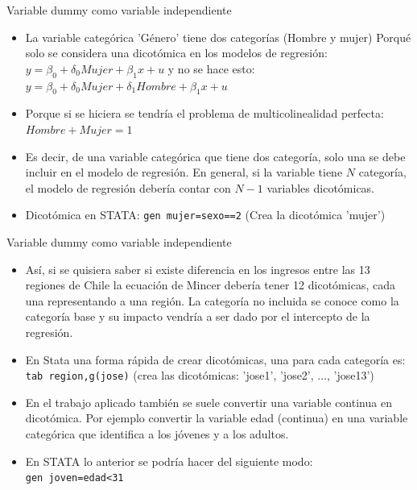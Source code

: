 \begin{frame}{Variable dummy como variable independiente}
	\begin{itemize}
		\item La variable categórica 'Género' tiene dos categorí­as (Hombre y mujer) Porqué solo se considera una dicotómica en los modelos de
		regresión: $y=\beta_{0}+\delta_{0}Mujer+\beta_{1}x+u$ y no se hace esto: $y=\beta_{0}+\delta_{0}Mujer+\delta_{1}Hombre+\beta_{1}x+u$
		\pause
		\item Porque si se hiciera se tendrí­a el problema de multicolinealidad perfecta: $Hombre+Mujer=1$
		\pause
		\item Es decir, de una variable categórica que tiene dos categoría, solo una se debe incluir en el modelo de regresión. En general, si la
		variable tiene $N$ categoría, el modelo de regresión debería contar con $N-1$ variables dicotómicas.
		\pause 
		\item Dicotómica en STATA: \colorbox{codegray}{\texttt{\textcolor{codeblue}{gen} mujer=sexo==2}} (Crea la dicotómica 'mujer')
	\end{itemize}
\end{frame}
\begin{frame}{Variable dummy como variable independiente}
	\begin{itemize}
		\item Así, si se quisiera saber si existe diferencia en los ingresos entre las 13 regiones de Chile la ecuación de Mincer debería tener 12
		dicotómicas, cada una representando a una región. La categorí­a no incluida se conoce como la categoría base y su impacto vendría a ser dado
		por el intercepto de la regresión.
		\pause 
		\item En Stata una forma rápida de crear dicotómicas, una para cada categoría es: \colorbox{codegray}{\texttt{\textcolor{codeblue}{tab} region,g(jose)}} (crea las dicotómicas: 'jose1', 'jose2', ..., 'jose13')
		\pause
		\item En el trabajo aplicado también se suele convertir una variable continua en dicotómica. Por ejemplo convertir la variable edad
		(continua) en una variable categórica que identifica a los jóvenes y a los adultos.
		\pause
		\item En STATA lo anterior se podría hacer del siguiente modo:\\ \colorbox{codegray}{\texttt{\textcolor{codeblue}{gen} joven=edad<31}}
	\end{itemize}
\end{frame}

